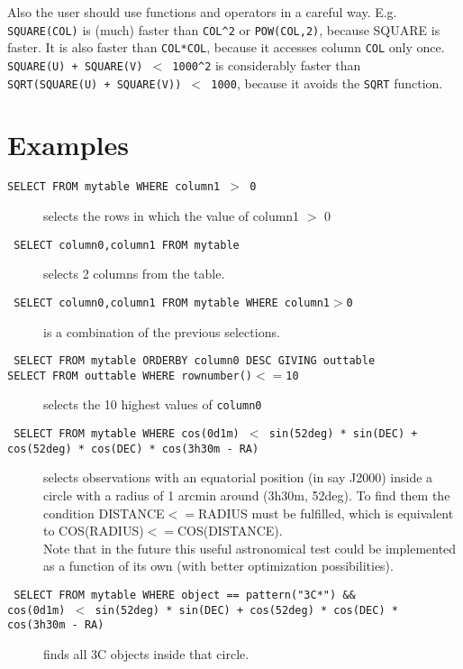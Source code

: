 Also the user should use functions and operators in a careful way.
E.g.
\\\texttt{SQUARE(COL)} is (much) faster than \texttt{COL}\verb+^+\texttt{2}
or \texttt{POW(COL,2)}, because SQUARE is faster.
It is also faster than \texttt{COL*COL}, because it accesses column
\texttt{COL} only once.
\\
\texttt{SQUARE(U) + SQUARE(V) $<$ 1000}\verb+^+\texttt{2} is considerably faster
than
\\\texttt{SQRT(SQUARE(U) + SQUARE(V)) $<$ 1000}, because it avoids the
\texttt{SQRT} function.


\section{Examples}
\begin{description}
  \item[\texttt{SELECT FROM mytable WHERE column1 $>$ 0 }]
       selects the rows in which the value of column1 $>$ 0
  \item[\texttt{ SELECT column0,column1 FROM mytable } ]
       selects 2 columns from the table.
  \item[\texttt{ SELECT column0,column1 FROM mytable WHERE column1$>$0 } ]
       is a combination of the previous selections.
  \item[\texttt{ SELECT FROM mytable ORDERBY column0 DESC GIVING outtable
       \\SELECT FROM outtable WHERE rownumber()$<=$10 } ]
       selects the 10 highest values of \texttt{column0}
  \item[\texttt{ SELECT FROM mytable WHERE cos(0d1m) $<$
       sin(52deg) * sin(DEC) + cos(52deg) * cos(DEC) * cos(3h30m - RA) } ]
       selects observations with an equatorial position (in say J2000)
       inside a circle with a radius of 1 arcmin around (3h30m, 52deg).
       To find them the condition DISTANCE$<=$RADIUS must be fulfilled,
       which is equivalent to COS(RADIUS)$<=$COS(DISTANCE).
       \\Note that in the future this useful astronomical test could
       be implemented as a function of its own (with better optimization
       possibilities).
  \item[\texttt{ SELECT FROM mytable WHERE object == pattern("3C*")  \&\&  \\cos(0d1m) $<$ sin(52deg) * sin(DEC) + cos(52deg) * cos(DEC) * cos(3h30m - RA) } ]
       finds all 3C objects inside that circle.
\end{description}

